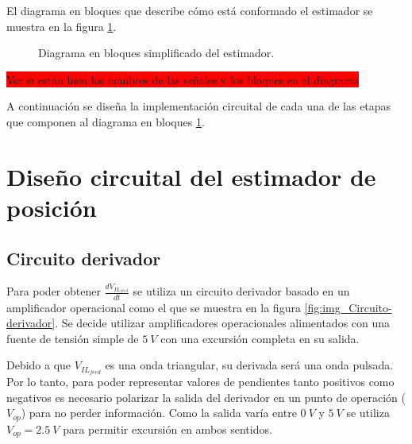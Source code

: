 El diagrama en bloques que describe cómo está conformado el estimador se muestra en la figura \ref{fig:img_diag-en-bloques_estimador}.

\begin{figure}[H]
	\centering
	
	\caption{Diagrama en bloques simplificado del estimador.}	\label{fig:img_diag-en-bloques_estimador}
\end{figure}
\colorbox{red}{Ver si están bien los nombres de las señales y los bloques en el diagrama}

A continuación se diseña la implementación circuital de cada una de las etapas que componen al diagrama en bloques \ref{fig:img_diag-en-bloques_estimador}.

{
	
}


\section{Diseño circuital del estimador de posición}

\subsection{Circuito derivador}

Para poder obtener $\frac{dV_{IL_{feed}}}{dt}$ se utiliza un circuito derivador basado en un amplificador operacional como el que se muestra en la figura \ref{fig:img_Circuito-derivador}. Se decide utilizar amplificadores operacionales alimentados con una fuente de tensión simple de $5\:V$ con una excursión completa en su salida. 

Debido a que $V_{IL_{feed}}$ es una onda triangular, su derivada será una onda pulsada. Por lo tanto, para poder representar valores de pendientes tanto positivos como negativos es necesario polarizar la salida del derivador en un punto de operación ($V_{op}$) para no perder información. Como la salida varía entre $0\:V$ y $5\:V$ se utiliza $V_{op}=2.5\:V$ para permitir excursión en ambos sentidos.

